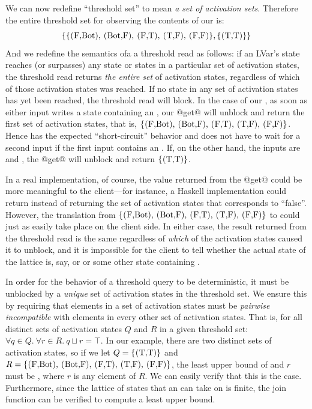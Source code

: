 We can now redefine ``threshold set'' to mean \emph{a set of
  activation sets}.  Therefore the entire threshold set for observing
the contents of our  is:
\[
\{ 
\{ \textrm{\il{(F,Bot)}, \il{(Bot,F)}, \il{(F,T)}, \il{(T,F)}, \il{(F,F)}} \},
\{ \textrm{\il{(T,T)}} \}
\}
\]
And we redefine the semantics ofa a threshold read as follows: if an
LVar's state reaches (or surpasses) any state or states in a
particular set of activation states, the threshold read returns
\emph{the entire set} of activation states, regardless of which of
those activation states was reached. If no state in any set of
activation states has yet been reached, the threshold read will block.
In the case of our , as soon as either input writes a state
containing an , our @get@ will unblock and return the first set
of activation states, that is, $\{ \textrm{\il{(F,Bot)}, \il{(Bot,F)},
  \il{(F,T)}, \il{(T,F)}, \il{(F,F)}} \}$.  Hence  has the
expected ``short-circuit'' behavior and does not have to wait for a
second input if the first input contains an .  If, on the other
hand, the inputs are  and , the @get@ will
unblock and return $\{ \textrm{\il{(T,T)}} \}$.

In a real implementation, of course, the value returned from the @get@
could be more meaningful to the client---for instance, a Haskell
implementation could return  instead of returning the set of
activation states that corresponds to ``false''.  However, the
translation from $\{ \textrm{\il{(F,Bot)}, \il{(Bot,F)}, \il{(F,T)},
  \il{(T,F)}, \il{(F,F)}} \}$ to  could just as easily take
place on the client side.  In either case, the result returned from
the threshold read is the same regardless of \emph{which} of the
activation states caused it to unblock, and it is impossible for the
client to tell whether the actual state of the lattice is, say,
 or  or some other state containing .


In order for the behavior of a threshold query
to be deterministic, it must be unblocked by
a \emph{unique} set of activation states in the threshold set.  
We ensure this by
requiring that elements in a set of activation states must be
\emph{pairwise incompatible} with elements in every other set of
activation states.  That is, for all distinct sets of activation states $Q$
and $R$ in a given threshold set: $\forall q \in Q.~\forall r \in R.~q \sqcup r = \top$.
In our  example, there are two distinct sets of activation states, so if
we let $Q = \{ \textrm{\il{(T,T)}} \}$ and $R = \{
\textrm{\il{(F,Bot)}, \il{(Bot,F)}, \il{(F,T)}, \il{(T,F)},
  \il{(F,F)}} \}$, the least upper bound of  and $r$ must be
, where $r$ is any element of $R$.  We can easily verify that
this is the case.  Furthermore, since the lattice of states that an
 can take on is finite, the join function can be verified to compute a
least upper bound.

